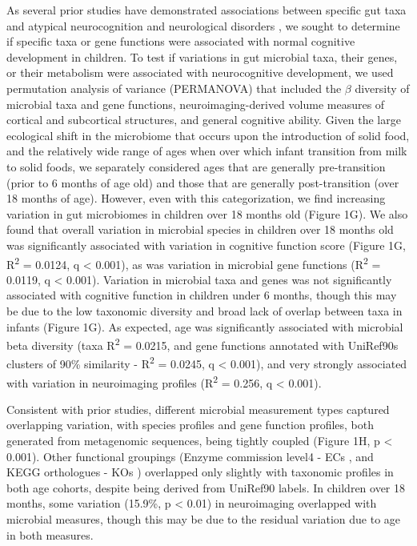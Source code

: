 \documentclass{article}
\begin{document}
As several prior studies have demonstrated associations between specific gut taxa
and atypical neurocognition and neurological disorders
\cite{liuAlteredGutMicrobiota2019,wanUnderdevelopmentGutMicrobiota2021,
      magnussonRelationshipsDietrelatedChanges2015,mayneris-perxachsMicrobiotaAlterationsProline2022,
      needhamGutderivedMetaboliteAlters2022},
we sought to determine if specific taxa or gene functions were associated
with normal cognitive development in children.
To test if variations in gut microbial taxa,
their genes, or their metabolism were associated with neurocognitive
development, we used permutation analysis of variance (PERMANOVA) 
that included the $\beta$ diversity of microbial taxa and gene functions,
neuroimaging-derived volume measures of cortical and subcortical structures,
and general cognitive ability.
Given the large ecological shift in the microbiome that occurs upon the introduction of solid food,
and the relatively wide range of ages when over which infant transition from milk to solid foods,
we separately considered ages that are generally pre-transition (prior to 6 months of age old)
and those that are generally post-transition (over 18 months of age).
However, even with this categorization, we find increasing variation
in gut microbiomes in children over 18 months old (Figure 1G).
We also found that overall variation in microbial species in children over 18 months old
was significantly associated with variation in cognitive function score
(Figure 1G, R\textsuperscript{2} = 0.0124, q \textless{} 0.001),
as was variation in microbial gene functions (R\textsuperscript{2} = 0.0119, q \textless{} 0.001).
Variation in microbial taxa and genes was not significantly associated with cognitive
function in children under 6 months, though this may be due to the low
taxonomic diversity and broad lack of overlap between taxa in infants (Figure 1G).
As expected, age was significantly associated with microbial beta
diversity (taxa R\textsuperscript{2} = 0.0215, and  gene functions
annotated with UniRef90s clusters of 90\% similarity
\cite{suzekUniRefComprehensiveNonredundant2007} -
R\textsuperscript{2} = 0.0245, q \textless{} 0.001), and very strongly
associated with variation in neuroimaging profiles (R\textsuperscript{2} = 0.256, q
\textless{} 0.001).

Consistent with prior studies, different microbial measurement types
captured overlapping variation, with species profiles and gene function
profiles, both generated from metagenomic sequences, being tightly coupled
(Figure 1H, p \textless{} 0.001). Other functional
groupings (Enzyme commission level4 - ECs
\cite{bairochENZYMEDatabase20002000},
and KEGG orthologues - KOs
\cite{kanehisaKEGGResourceDeciphering2004})
overlapped only slightly with taxonomic profiles in both age
cohorts, despite being derived from UniRef90 labels. In children over 18
months, some variation (15.9\%, p \textless{} 0.01) in neuroimaging
overlapped with microbial measures, though this may be due to the
residual variation due to age in both measures.
\end{document}
